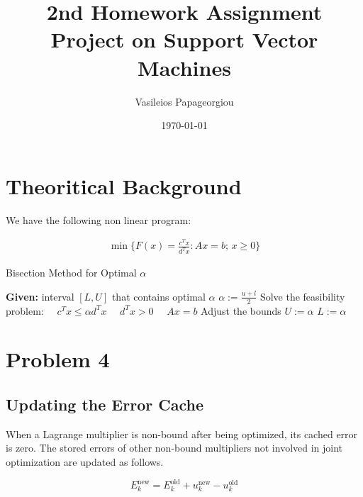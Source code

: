 \documentclass[10pt,a4paper]{article}
\title{2nd Homework Assignment \\ \huge{Project on Support Vector Machines}}
\author{Vasileios Papageorgiou}
\date{\today}
\begin{document}
	\maketitle
	\thispagestyle{fancy}
	
	

\section*{Theoritical Background}

We have the following non linear program:

\begin{equation}\label{eq:3}
	\begin{aligned}
		\min \{ F(x) = \frac{c^T x}{d^T x} : A x = b; \, x \geq 0 \}
	\end{aligned}
\end{equation}



\begin{algorithm}
	\caption{Bisection Method for Optimal $\alpha$}
	\begin{algorithmic}[1]
		\State \textbf{Given:} interval $[L, U]$ that contains optimal $\alpha$
		\Repeat
		\State $\alpha := \frac{u + l}{2}$
		\State Solve the feasibility problem:
		\State $\quad c^T x \leq \alpha d^T x $
		\State $\quad d^T x > 0$
		\State $\quad Ax = b$
		\State Adjust the bounds
		\State $U := \alpha$
		\Else
		\State $L := \alpha$
		\EndIf
	\end{algorithmic}
\end{algorithm}

\section*{Problem 4}

\subsection{Updating the Error Cache}

When a Lagrange multiplier is non-bound after being optimized, its cached error is zero. The stored errors of other
non-bound multipliers not involved in joint optimization are updated as follows.

\begin{equation}
	E_k^{\text{new}} = E_k^{\text{old}} + u_k^{\text{new}} - u_k^{\text{old}} \tag{3.36}
\end{equation}
\end{document}
